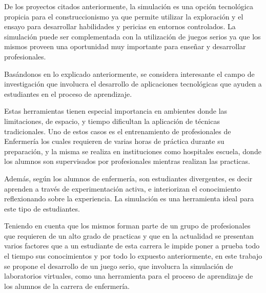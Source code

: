 De los proyectos citados anteriormente, la simulación es una opción tecnológica propicia 
para el construccionismo ya que permite utilizar la exploración y el ensayo para desarrollar 
habilidades y pericias en entornos controlados\cite{humphreys2013developing}. La simulación
puede ser complementada con la utilización de juegos serios ya que los mismos proveen una 
oportunidad muy importante para enseñar y desarrollar profesionales\cite{sg:aoverview}.

Basándonos en lo explicado anteriormente, se considera interesante el campo de
investigación que involucra el desarrollo de aplicaciones tecnológicas que
ayuden a estudiantes en el proceso de aprendizaje. 

Estas herramientas tienen especial importancia en ambientes donde las limitaciones,
de espacio, y tiempo dificultan la aplicación de técnicas tradicionales. Uno de
estos casos es el entrenamiento de profesionales de Enfermería los cuales
requieren de varias horas de práctica durante su preparación, y la misma se
realiza en instituciones como hospitales escuela, donde los alumnos son
supervisados por profesionales mientras realizan las practicas.

Además, según \cite{humphreys2013developing} los alumnos de enfermería, son
estudiantes divergentes, es decir aprenden a través de experimentación activa, e
interiorizan el conocimiento reflexionando sobre la experiencia. La
simulación es una herramienta ideal para este tipo de estudiantes\cite{humphreys2013developing}.

Teniendo en cuenta que los mismos forman parte de un grupo de
profesionales que requieren de un alto grado de practicas y que en la actualidad
se presentan varios factores que a un estudiante de esta carrera le impide poner
a prueba todo el tiempo sus conocimientos y por todo lo expuesto anteriormente, 
en este trabajo se propone el desarrollo de un juego serio, que involucra la simulación 
de laboratorios virtuales, como una herramienta para el proceso de aprendizaje de los 
alumnos de la carrera de enfermería.




